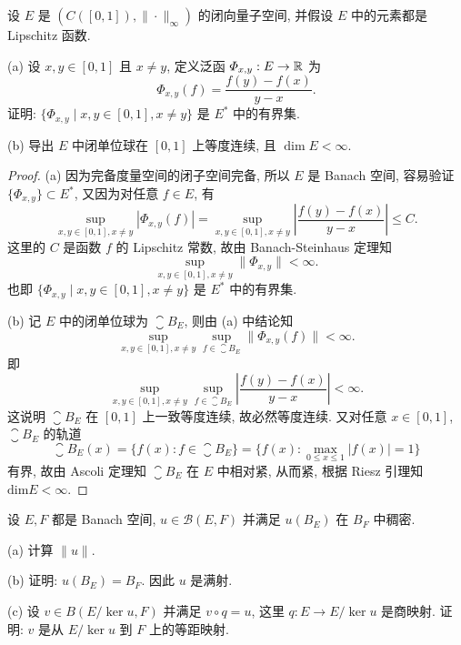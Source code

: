 \begin{exercise}[8]
    设 $E$ 是 $(C([0,1]),\|\cdot\|_{\infty})$ 的闭向量子空间, 并假设 $E$ 中的元素都是 Lipschitz 函数.

    (a) 设 $x,y\in [0,1]$ 且 $x\neq y$, 定义泛函 $\varPhi_{x,y}:E\to\mathbb{R}$ 为
    \[\varPhi_{x,y}(f)=\frac{f(y)-f(x)}{y-x}.\]
    证明: $\{\varPhi_{x,y}\mid x,y\in [0,1],x\neq y\}$ 是 $E^*$ 中的有界集.

    (b) 导出 $E$ 中闭单位球在 $[0,1]$ 上等度连续, 且 $\dim E<\infty$.
\end{exercise}

\begin{proof}
    (a) 因为完备度量空间的闭子空间完备, 所以 $E$ 是 Banach 空间,
    容易验证 $\{\varPhi_{x,y}\}\subset E^*$, 又因为对任意 $f\in E$, 有
    \[\sup_{x,y\in[0,1],x\neq y}|\varPhi_{x,y}(f)|=\sup_{x,y\in[0,1],x\neq y}\left|\frac{f(y)-f(x)}{y-x}\right|\leq C.\]
    这里的 $C$ 是函数 $f$ 的 Lipschitz 常数, 故由 Banach-Steinhaus 定理知
    \[\sup_{x,y\in[0,1],x\neq y}\|\varPhi_{x,y}\|<\infty.\]
    也即 $\{\varPhi_{x,y}\mid x,y\in[0,1],x\neq y\}$ 是 $E^*$ 中的有界集.

    (b) 记 $E$ 中的闭单位球为 $\closure{B_E}$, 则由 (a) 中结论知
    \[\sup_{x,y\in[0,1],x\neq y}\sup_{f\in \closure{B_E}}\|\varPhi_{x,y}(f)\|<\infty.\]
    即
    \[\sup_{x,y\in[0,1],x\neq y}\sup_{f\in \closure{B_E}}\left|\frac{f(y)-f(x)}{y-x}\right|<\infty.\]
    这说明 $\closure{B_E}$ 在 $[0,1]$ 上一致等度连续, 故必然等度连续.
    又对任意 $x\in[0,1]$, $\closure{B_E}$ 的轨道
    \[\closure{B_E}(x)=\{f(x):f\in \closure{B_E}\}=\{f(x):\max_{0\leq x\leq 1}|f(x)|=1\}\]
    有界, 故由 Ascoli 定理知 $\closure{B_E}$ 在 $E$ 中相对紧, 从而紧, 根据 Riesz 引理知 $\textrm{dim}E<\infty$.
\end{proof}



\begin{exercise}[10]
    设 $E,F$ 都是 Banach 空间, $u\in\mathcal{B}(E,F)$ 并满足 $u(B_E)$ 在 $B_F$ 中稠密.

    (a) 计算 $\|u\|$.

    (b) 证明: $u(B_E)=B_F$. 因此 $u$ 是满射.

    (c) 设 $v\in B(E/\ker u,F)$ 并满足 $v\circ q=u$, 这里 $q:E\to E/\ker u$
    是商映射. 证明: $v$ 是从 $E/\ker u$ 到 $F$ 上的等距映射.
\end{exercise}

